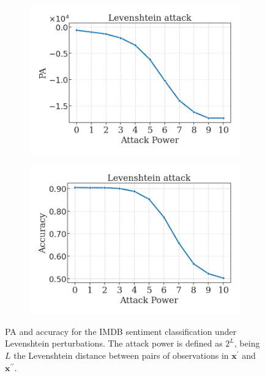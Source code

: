 \begin{figure}[b]
    \centering
    \begin{subfigure}[b]{0.45\textwidth}
        \centering
        \includegraphics[width=\textwidth]{img/results_discussion/empirical/levenshtein_logPA.png}
    \end{subfigure}
    \hfill
    \begin{subfigure}[b]{0.45\textwidth}
        \centering
        \includegraphics[width=\textwidth]{img/results_discussion/empirical/levenshtein_AFR_true.png}
    \end{subfigure}
    \caption{PA and accuracy for the IMDB sentiment classification under Levenshtein perturbations.
    The attack power is defined as $2^L$, being $L$ the Levenshtein distance between pairs of
    observations in $\bm{x}^\prime$ and $\bm{x}^{\prime\prime}$.}
    \label{fig:imdb_levenshtein}
\end{figure}


